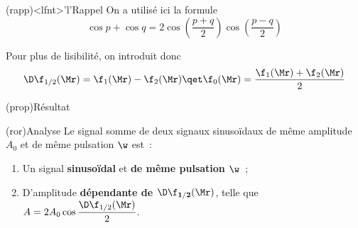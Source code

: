 \documentclass[../../main/main.tex]{subfiles}
\begin{document}
\begin{tcb}(rapp)<lfnt>'l'{Rappel}
	\vspace{-10pt}
	On a utilisé ici la formule
	\[\cos p + \cos q =
		2\cos \left( \frac{p+q}{2} \right)\cos \left( \frac{p-q}{2} \right)\]
	\vspace{-24pt}
\end{tcb}

Pour plus de lisibilité, on introduit donc
\[
	\D\f_{1/2}(\Mr) = \f_1(\Mr) - \f_2(\Mr)
	\qet
	\f_0(\Mr) = \frac{\f_1(\Mr)+\f_2(\Mr)}{2}
\]
\begin{tcb}(prop){Résultat}
	\vspace{-15pt}
\end{tcb}
\begin{tcb}(ror){Analyse}
	Le signal somme de deux signaux sinusoïdaux de même amplitude $A_0$ et de
	même pulsation $\w$ est~:
	\begin{enumerate}
		\item Un signal \textbf{sinusoïdal} et \textbf{de même pulsation
			      $\mathbf{\w}$}~;
		\item D'amplitude \textbf{dépendante de $\mathbf{\D\f_{1/2}(\Mr)}$}, telle que
		      $A = 2A_0\cos\dfrac{\D\f_{1/2}(\Mr)}{2}$.
	\end{enumerate}


\end{tcb}
\end{document}
